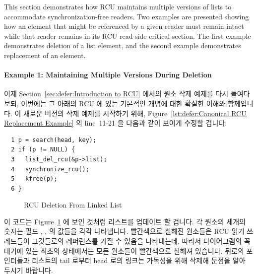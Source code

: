 This section demonstrates how RCU maintains multiple versions of
lists to accommodate synchronization-free readers.
Two examples are presented showing how an element
that might be referenced by a given reader must remain intact
while that reader remains in its RCU read-side critical section.
The first example demonstrates deletion of a list element,
and the second example demonstrates replacement of an element.
\fi

\paragraph{Example 1: Maintaining Multiple Versions During Deletion}
\label{sec:defer:Example 1: Maintaining Multiple Versions During Deletion}

이제 Section~\ref{sec:defer:Introduction to RCU} 에서의 원소 삭제 예제를 다시
들여다 보되, 이번에는 그 아래의 RCU 에 있는 기본적인 개념에 대한 확실한 이해와
함께입니다.
이 새로운 버전의 삭제 예제를 시작하기 위해,
Figure~\ref{lst:defer:Canonical RCU Replacement Example} 의 line~11-21 을
다음과 같이 보이게 수정할 겁니다:

\vspace{5pt}
\begin{minipage}[t]{\columnwidth}
\scriptsize
\begin{verbatim}
  1 p = search(head, key);
  2 if (p != NULL) {
  3   list_del_rcu(&p->list);
  4   synchronize_rcu();
  5   kfree(p);
  6 }
\end{verbatim}
\end{minipage}
\vspace{5pt}

\begin{figure}[tb]
\begin{center}
\end{center}
\caption{RCU Deletion From Linked List}
\label{fig:defer:RCU Deletion From Linked List}
\end{figure}

이 코드는
Figure~\ref{fig:defer:RCU Deletion From Linked List} 에 보인 것처럼 리스트를
업데이트 할 겁니다.
각 원소의 세개의 숫자는 필드 , ,  의 값들을 각각 나타냅니다.
빨간색으로 칠해진 원소들은 RCU 읽기 쓰레드들이 그것들로의 레퍼런스를 가질 수
있음을 나타내는데, 따라서 다이어그램의 꼭대기에 있는 최초의 상태에서는 모든
원소들이 빨간색으로 칠해져 있습니다.
뒤로의 포인터들과 리스트의 tail 로부터 head 로의 링크는 가독성을 위해 삭제해
둔점을 알아 두시기 바랍니다.
\iffalse


